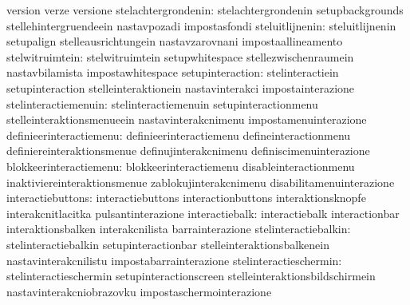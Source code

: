                                   version                          verze
                                  versione
             stelachtergrondenin: stelachtergrondenin              setupbackgrounds
                                  stellehintergruendeein           nastavpozadi
                                  impostasfondi
                 steluitlijnenin: steluitlijnenin                  setupalign
                                  stelleausrichtungein             nastavzarovnani
                                  impostaallineamento
                 stelwitruimtein: stelwitruimtein                  setupwhitespace
                                  stellezwischenraumein            nastavbilamista
                                  impostawhitespace                %
                setupinteraction: stelinteractiein                 setupinteraction
                                  stelleinteraktionein             nastavinterakci
                                  impostainterazione
            stelinteractiemenuin: stelinteractiemenuin             setupinteractionmenu
                                  stelleinteraktionsmenueein       nastavinterakcnimenu
                                  impostamenuinterazione
         definieerinteractiemenu: definieerinteractiemenu          defineinteractionmenu
                                  definiereinteraktionsmenue       definujinterakcnimenu
                                  definiscimenuinterazione
          blokkeerinteractiemenu: blokkeerinteractiemenu           disableinteractionmenu
                                  inaktiviereinteraktionsmenue     zablokujinterakcnimenu
                                  disabilitamenuinterazione
               interactiebuttons: interactiebuttons                interactionbuttons
                                  interaktionsknopfe               interakcnitlacitka
                                  pulsantinterazione
                  interactiebalk: interactiebalk                   interactionbar
                                  interaktionsbalken               interakcnilista
                                  barrainterazione
            stelinteractiebalkin: stelinteractiebalkin             setupinteractionbar
                                  stelleinteraktionsbalkenein      nastavinterakcnilistu
                                  impostabarrainterazione
          stelinteractieschermin: stelinteractieschermin           setupinteractionscreen
                                  stelleinteraktionsbildschirmein  nastavinterakcniobrazovku
                                  impostaschermointerazione
